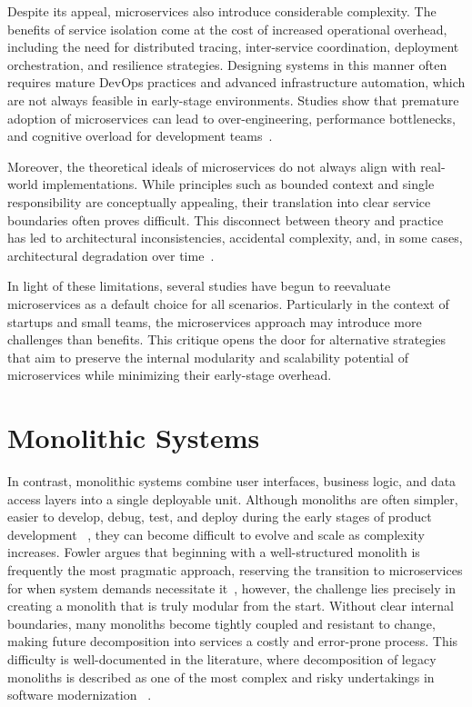 Despite its appeal, microservices also introduce considerable complexity. The benefits of service isolation come at the cost of increased operational overhead, including the need for distributed tracing, inter-service coordination, deployment orchestration, and resilience strategies. Designing systems in this manner often requires mature DevOps practices and advanced infrastructure automation, which are not always feasible in early-stage environments. Studies show that premature adoption of microservices can lead to over-engineering, performance bottlenecks, and cognitive overload for development teams~\cite{fritzsch2019, gysel2016service, newman2019monolith}.

Moreover, the theoretical ideals of microservices do not always align with real-world implementations. While principles such as bounded context and single responsibility are conceptually appealing, their translation into clear service boundaries often proves difficult. This disconnect between theory and practice has led to architectural inconsistencies, accidental complexity, and, in some cases, architectural degradation over time~\cite{taibi2018definition, deLauretis2019from}.

In light of these limitations, several studies have begun to reevaluate microservices as a default choice for all scenarios. Particularly in the context of startups and small teams, the microservices approach may introduce more challenges than benefits. This critique opens the door for alternative strategies that aim to preserve the internal modularity and scalability potential of microservices while minimizing their early-stage overhead.

\section{Monolithic Systems}

In contrast, monolithic systems combine user interfaces, business logic, and data access layers into a single deployable unit. Although monoliths are often simpler, easier to develop, debug, test, and deploy during the early stages of product development ~\cite{richardson2018microservices}, they can become difficult to evolve and scale as complexity increases. Fowler argues that beginning with a well-structured monolith is frequently the most pragmatic approach, reserving the transition to microservices for when system demands necessitate it~\cite{fowler2015,newman2019monolith}, however, the challenge lies precisely in creating a monolith that is truly modular from the start. Without clear internal boundaries, many monoliths become tightly coupled and resistant to change, making future decomposition into services a costly and error-prone process. This difficulty is well-documented in the literature, where decomposition of legacy monoliths is described as one of the most complex and risky undertakings in software modernization ~\cite{alshuqayran2016systematic}.

